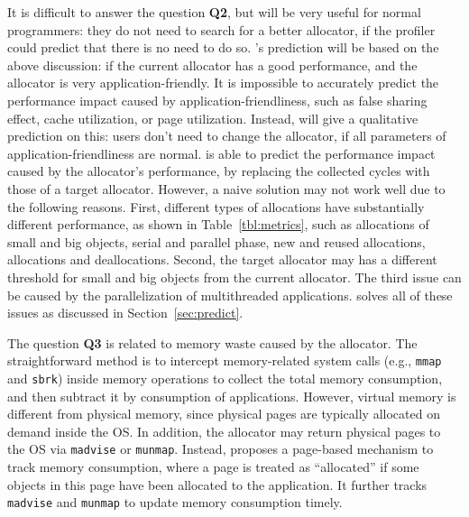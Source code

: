 
It is difficult to answer the question \textbf{Q2}, but will be very useful for normal programmers: they do not need to search for a better allocator, if the profiler could predict that there is no need to do so. \MP{}'s prediction will be based on the above discussion: if the current allocator has a good performance, and the allocator is very application-friendly. It is impossible to accurately predict the performance impact caused by application-friendliness, such as false sharing effect, cache utilization, or page utilization. Instead, \MP{} will give a qualitative prediction on this: users don't need to change the allocator, if all parameters of application-friendliness are normal. \MP{} is able to predict the performance impact caused by the allocator's performance, by replacing the collected cycles with those of a target allocator.   However, a naive solution may not work well due to the following reasons. First, different types of allocations have substantially different performance, as shown in Table~\ref{tbl:metrics}, such as allocations of small and big objects, serial and parallel phase, new and reused allocations, allocations and deallocations. Second, the target allocator may has a different threshold for small and big objects from the current allocator. The third issue can be caused by the parallelization of multithreaded applications. \MP{} solves all of these issues as discussed in Section~\ref{sec:predict}.

The question \textbf{Q3} is related to memory waste caused by the allocator. The straightforward method is to intercept memory-related system calls (e.g., \texttt{mmap} and \texttt{sbrk}) inside memory operations to collect the total memory consumption, and then subtract it by consumption of applications. However, virtual memory is different from physical memory, since physical pages are typically allocated on demand inside the OS. In addition, the allocator may return physical pages to the OS via \texttt{madvise} or \texttt{munmap}. Instead, \MP{} proposes a page-based mechanism to track memory consumption, where a page is treated as ``allocated'' if some objects in this page have been allocated to the application. It further tracks \texttt{madvise} and \texttt{munmap} to update memory consumption timely.

